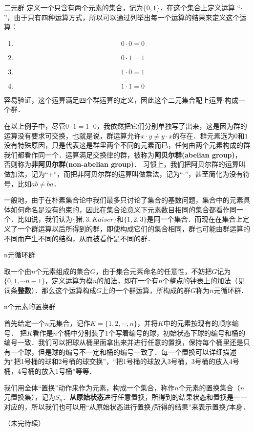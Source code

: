 \begin{example}{二元群}\label{Group_ex1}
定义一个只含有两个元素的集合，记为$\{0, 1\}$．在这个集合上定义运算 “$\cdot$”，由于只有四种运算方式，所以可以通过列举出每一个运算的结果来定义这个运算：
\begin{enumerate}
\item $$0\cdot0=0$$
\item $$0\cdot1=1$$
\item $$1\cdot0=1$$
\item $$1\cdot1=0$$
\end{enumerate}



容易验证，这个运算满足四个群运算的定义，因此这个二元集合配上运算$\cdot$构成一个群．

\end{example}

在以上例子中，尽管$0\cdot1=1\cdot0$，我依然把它们分别单独写了出来，这是因为群的运算没有要求可交换，也就是说，群运算允许$x\cdot y\neq y\cdot x$的存在．群元素选为$0$和$1$没有特殊原因，只是代表这是群里两个不同的元素而已，任何由两个元素构成的群我们都看作同一个．运算满足交换律的群，被称为\textbf{阿贝尔群(abelian group)}， 否则称为\textbf{非阿贝尔群(non-abelian group)}． 习惯上，我们把阿贝尔群的运算叫做加法，记为“$+$”，而把非阿贝尔群的运算叫做乘法，记为“$\cdot$”，甚至简化为没有符号，比如$ab\not= ba$．

一般地，由于在朴素集合论中我们最多只讨论了集合的基数问题，集合中的元素具体如何命名是没有约束的，因此在集合论意义下元素数目相同的集合都看作同一个．比如说，我们认为$\{\text{猪},3, Kaiser \}$和$\{1,2,3\}$是同一个集合．而现在在集合上定义了一个群运算以后所得到的群，即使构成它们的集合相同，群也可能由群运算的不同而产生不同的结构，从而被看作是不同的群．

\begin{example}{n元循环群}\label{Group_ex2}

取一个由$n$个元素组成的集合$G$，由于集合元素命名的任意性，不妨把$G$记为$\{0, 1, \cdots n-1\}$，定义运算为模$n$的加法，即在一个有$n$个整点的钟表上的加法（见词条\textbf{整数}）．那么这个运算构成$G$上的一个群运算，所构成的群$G$称为$n$元循环群．




\end{example}

\begin{example}{n个元素的置换群}\label{Group_ex3}

首先给定一个$n$元集合，记作$K=\{1,2, \cdots, n\}$，并将$K$中的元素按现有的顺序编号． 把$K$看作是$n$个桶中分别装了1个写着编号的球，初始状态下球的编号和桶的编号一致．我们可以把球从桶里面拿出来并进行任意的置换，保持每个桶里还是只有一个球，但是球的编号不一定和桶的编号一致了．每一个置换可以详细描述为“把1号桶的球和2号桶的球交换”，“把1号桶的球放入3号桶，3号桶的放入4号桶，4号桶的放入1号桶”等等．

我们用全体“置换”动作来作为元素，构成一个集合，称作$n$个元素的置换集合（$n$元置换集），记为$S_n$．\textbf{从原始状态}进行任意置换，所得到的结果状态和置换是一一对应的，所以我们也可以用“从原始状态进行置换$f$所得的结果”来表示置换$f$本身．

（未完待续）


\end{example}